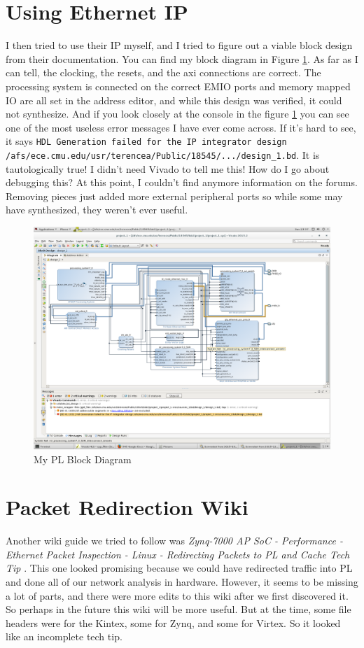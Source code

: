 \documentclass[12pt]{report}
\begin{document}
\section{Using Ethernet IP}
I then tried to use their IP myself, and I tried to figure out a viable block design from their documentation. You can find my block diagram in Figure \ref{fig:my_design}.
As far as I can tell, the clocking, the resets, and the axi connections are correct.
The processing system is connected on the correct EMIO ports and memory mapped IO are all set in the address editor, and while this design was verified, it could not synthesize.
And if you look closely at the console in the figure \ref{fig:my_design} you can see one of the most useless error messages I have ever come across.
If it's hard to see, it says \texttt{HDL Generation failed for the IP integrator design /afs/ece.cmu.edu/usr/terencea/Public/18545/.../design\_1.bd}.
It is tautologically true! I didn't need Vivado to tell me this! How do I go about debugging this?
At this point, I couldn't find anymore information on the forums.
Removing pieces just added more external peripheral ports so while some may have synthesized,
they weren't ever useful.

\begin{figure}[H]
\centering
\includegraphics[width=6in]{my_design}
\caption{My PL Block Diagram}
\label{fig:my_design}
\end{figure}

\section{Packet Redirection Wiki}
Another wiki guide we tried to follow was \textit{Zynq-7000 AP SoC - Performance - Ethernet Packet Inspection - Linux - Redirecting Packets to PL and Cache Tech Tip} \cite{redirect}. This one looked promising because we could have redirected traffic into PL and done all of our network analysis in hardware. However, it seems to be missing a lot of parts, and there were more edits to this wiki after we first discovered it. So perhaps in the future this wiki will be more useful. But at the time, some file headers were for the Kintex, some for Zynq, and some for Virtex. So it looked like an incomplete tech tip.
\end{document}
